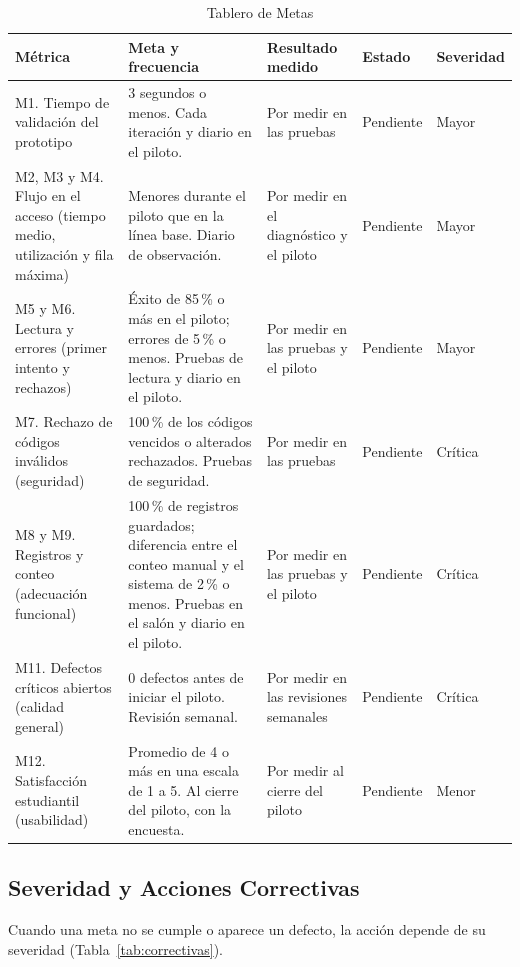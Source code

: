 \begin{table}[tbp]
	\caption{Tablero de Metas}
	\label{tab:tablero}
	\small\setlength{\tabcolsep}{3pt}
	\begin{tabular}{P{3.8cm}P{4.8cm}P{2.3cm}P{2.2cm}P{1.8cm}}
		\toprule
		Métrica & Meta y frecuencia & Resultado medido & Estado & Severidad \\
		\midrule
		M1. Tiempo de validación del prototipo & 3 segundos o menos. Cada iteración y diario en el piloto. & Por medir en las pruebas & Pendiente & Mayor \\
		M2, M3 y M4. Flujo en el acceso (tiempo medio, utilización y fila máxima) & Menores durante el piloto que en la línea base. Diario de observación. & Por medir en el diagnóstico y el piloto & Pendiente & Mayor \\
		M5 y M6. Lectura y errores (primer intento y rechazos) & Éxito de 85\,\% o más en el piloto; errores de 5\,\% o menos. Pruebas de lectura y diario en el piloto. & Por medir en las pruebas y el piloto & Pendiente & Mayor \\
		M7. Rechazo de códigos inválidos (seguridad) & 100\,\% de los códigos vencidos o alterados rechazados. Pruebas de seguridad. & Por medir en las pruebas & Pendiente & Crítica \\
		M8 y M9. Registros y conteo (adecuación funcional) & 100\,\% de registros guardados; diferencia entre el conteo manual y el sistema de 2\,\% o menos. Pruebas en el salón y diario en el piloto. & Por medir en las pruebas y el piloto & Pendiente & Crítica \\
		M11. Defectos críticos abiertos (calidad general) & 0 defectos antes de iniciar el piloto. Revisión semanal. & Por medir en las revisiones semanales & Pendiente & Crítica \\
		M12. Satisfacción estudiantil (usabilidad) & Promedio de 4 o más en una escala de 1 a 5. Al cierre del piloto, con la encuesta. & Por medir al cierre del piloto & Pendiente & Menor \\
		\bottomrule
	\end{tabular}
\end{table}

\subsection{Severidad y Acciones Correctivas}
Cuando una meta no se cumple o aparece un defecto, la acción depende de su
severidad (Tabla~\ref{tab:correctivas}).


